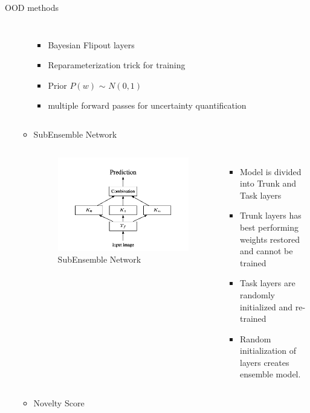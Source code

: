 \documentclass[10pt, aspectratio=169]{beamer}
\begin{document}
\begin{frame}[allowframebreaks]{OOD methods}
\begin{itemize}
\begin{itemize}
\begin{columns}
                    \begin{itemize}
                        \item Bayesian Flipout layers \citep{Wen2018}
                        \item Reparameterization trick for training \citep{Kingma2015}
                        \item Prior $P(w)$ $\sim$ $N(0, 1)$
                        \item multiple forward passes for uncertainty quantification \newline \newline
                    \end{itemize}
            \end{columns} 
            \pagebreak
            \item SubEnsemble Network 
            \begin{columns}
                    \begin{figure}
                        \includegraphics[scale=0.275]{images/subensembles.png}
                        \caption{SubEnsemble Network}
                    \end{figure}
                    \begin{itemize}
                        \item Model is divided into Trunk and Task layers
                        \item Trunk layers has best performing weights restored and cannot be trained
                        \item Task layers are randomly initialized and re-trained
                        \item Random initialization of layers creates ensemble model. 
                    \end{itemize}
            \end{columns} \newpage
            \item Novelty Score \newline
            

\end{itemize}
\end{itemize}
\end{frame}
\end{document}
